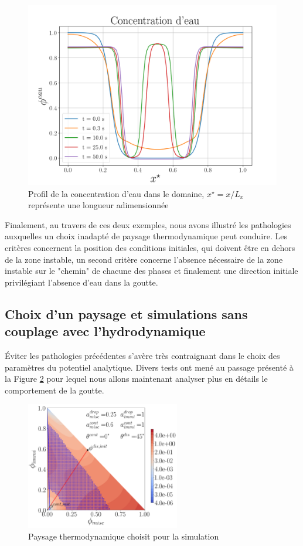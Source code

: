  \begin{figure}[H]
 	\centering
 	\includegraphics[width=0.5\linewidth]{figure/eau_ref}
 	\caption[Concentration d'eau dans le domaine]{Profil de la concentration d'eau dans le domaine, $x^{\star} = x / L_x$ représente une longueur adimensionnée}
 	\label{fig:eauref}
 \end{figure}\vspace{-0.7cm}
Finalement, au travers de ces deux exemples, nous avons illustré les pathologies auxquelles un choix inadapté de paysage thermodynamique peut conduire. Les critères concernent la position des conditions initiales, qui doivent être en dehors de la zone instable, un second critère concerne l'absence nécessaire de la zone instable sur le "chemin" de chacune des phases et finalement une direction initiale privilégiant l'absence d'eau dans la goutte.
\subsection{Choix d'un paysage et simulations sans couplage avec l'hydrodynamique}
Éviter les pathologies précédentes s'avère très contraignant dans le choix des paramètres du potentiel analytique. Divers tests ont mené au passage présenté à la Figure \ref{fig:thechoosenone} pour lequel nous allons maintenant analyser plus en détails le comportement de la goutte.
\begin{figure}[H]
		\centering
		\includegraphics[width=0.6\textwidth]{figure/Paysage_ecriture1.png}
	\caption{Paysage thermodynamique choisit pour la simulation}
	\label{fig:thechoosenone}
\end{figure}

